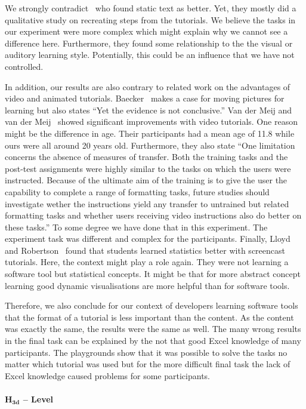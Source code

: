 We strongly contradict~\cite{mestre} who found static text as better. Yet, they mostly did a qualitative study on recreating steps from the tutorials. We believe the tasks in our experiment were more complex which might explain why we cannot see a difference here. Furthermore, they found some relationship to the the visual or auditory learning style. Potentially, this could be an influence that we have not controlled. 

In addition, our results are also contrary to related work on the advantages of video and animated tutorials. Baecker~\cite{baecker} makes a case for moving pictures for learning but also states ``Yet the evidence is not conclusive.''  Van der Meij and van der Meij~\cite{vanderMeij} showed significant improvements with video tutorials. One reason might be the difference in age. Their participants had a mean age of 11.8 while ours were all around 20 years old. Furthermore, they also state ``One limitation concerns the absence of measures of transfer. Both the training tasks and the post-test assignments were highly similar to the tasks on which the users were instructed. Because of the ultimate aim of the training is to give the user the capability to complete a range of formatting tasks, future studies should investigate wether the instructions yield any transfer to untrained but related formatting tasks and whether users receiving video instructions also do better on these tasks.'' To some degree we have done that in this experiment. The experiment task was different and complex for the participants. Finally, Lloyd and Robertson~\cite{lloyd} found that students learned statistics better with screencast tutorials. Here, the context might play a role again. They were
not learning a software tool but statistical concepts. It might be that for more abstract concept learning good dynamic visualisations are more helpful than
for software tools.

Therefore, we also conclude for our context of developers learning software tools that the format of a tutorial is less important than the content. As the content was exactly the same, the results were the same as well. The many wrong results in the final task can be explained by the not that good Excel knowledge of many participants. The playgrounds show that it was possible to solve the tasks no matter which tutorial was used but for the more difficult final task the lack of Excel knowledge caused problems for some participants. 

\paragraph{$\mathbf{H_{3d}}$ -- Level}

